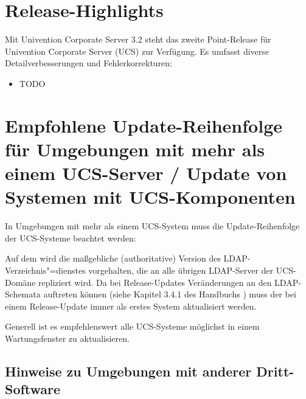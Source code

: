 


\newcommand{\ucsManualTitle}{UCS 3.2 Release Notes}
\newcommand{\ucsManualSubtitle}{Release Notes für die Inbetriebnahme und
Aktualisierung von Univention Corporate Server (UCS) 3.2}
\newcommand{\ucsManualVersion}{3.2}
\newcommand{\ucsTechAuthor}{ & Univention GmbH & feedback@univention.de}

\setcounter{secnumdepth}{3}
\setcounter{tocdepth}{3}



\chapter{Release-Highlights}

Mit Univention Corporate Server 3.2 steht das zweite Point-Release für
Univention Corporate Server (UCS) zur Verfügung. Es umfasst
diverse Detailverbesserungen und Fehlerkorrekturen:

\begin{itemize}
\item TODO %
\end{itemize}

\chapter{Empfohlene Update-Reihenfolge für Umgebungen mit mehr als einem UCS-Server / Update von Systemen mit UCS-Komponenten}

In Umgebungen mit mehr als einem UCS-System muss die Update-Reihenfolge der
UCS-Systeme beachtet werden:

Auf dem \ucsMaster{} wird die maßgebliche (authoritative) Version des
LDAP-Verzeichnis"=dienstes vorgehalten, die an alle übrigen LDAP-Server
der UCS-Domäne repliziert wird. Da bei Release-Updates Veränderungen
an den LDAP-Schemata auftreten können (siehe
Kapitel 3.4.1 des Handbuchs \cite{UCS-Handbuch}) muss der \ucsMaster{} bei einem
Release-Update immer als erstes System aktualisiert werden.

Generell ist es empfehlenswert alle UCS-Systeme möglichst in einem
Wartungsfenster zu aktualisieren.

\section{Hinweise zu Umgebungen mit anderer Dritt-Software}

